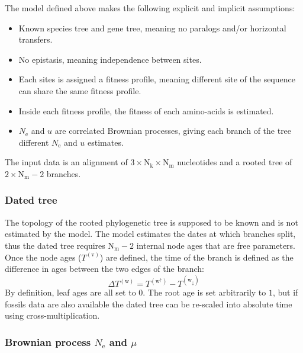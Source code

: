 \documentclass{article}
\newcommand{\site}{\text{k}}
\newcommand{\Nsite}{\text{N}_{\site}}
\newcommand{\taxon}{\text{m}}
\newcommand{\Ntaxa}{\text{N}_{\taxon}}
\newcommand{\branch}{\text{w}}
\newcommand{\up}{\branch^{\uparrow}}
\newcommand{\down}{\branch_{\downarrow}}
\newcommand{\node}{\text{v}}
\newcommand{\e}{\mathrm{e}}
\newcommand{\Ne}{N_\e}
\begin{document}
The model defined above makes the following explicit and implicit assumptions:
\begin{itemize}
	\setlength\itemsep{-0.25em}
	\item Known species tree and gene tree, meaning no paralogs and/or horizontal transfers.
	\item No epistasis, meaning independence between sites.
	\item Each sites is assigned a fitness profile, meaning different site of the sequence can share the same fitness profile.
	\item Inside each fitness profile, the fitness of each amino-acids is estimated.
	\item $\Ne$ and $u$ are correlated Brownian processes, giving each branch of the tree different $\Ne$ and $u$ estimates.
\end{itemize}

The input data is an alignment of $ 3 \times \Nsite \times \Ntaxa $ nucleotides and a rooted tree of $2 \times \Ntaxa - 2 $ branches.

\subsubsection{Dated tree}

The topology of the rooted phylogenetic tree is supposed to be known and is not estimated by the model. 
The model estimates the dates at which branches split, thus the dated tree requires $\Ntaxa - 2$ internal node ages that are free parameters. 
Once the node ages ($T^{(\node)}$) are defined, the time of the branch is defined as the difference in ages between the two edges of the branch:
\begin{equation}
\Delta T^{(\branch)} =  T^{(\up)} - T^{(\down)} 
\end{equation}
By definition, leaf ages are all set to $0$. The root age is set arbitrarily to $1$, but if fossils data are also available the dated tree can be re-scaled into absolute time using cross-multiplication.

\subsubsection{Brownian process $\Ne$ and $\mu$}
\end{document}
